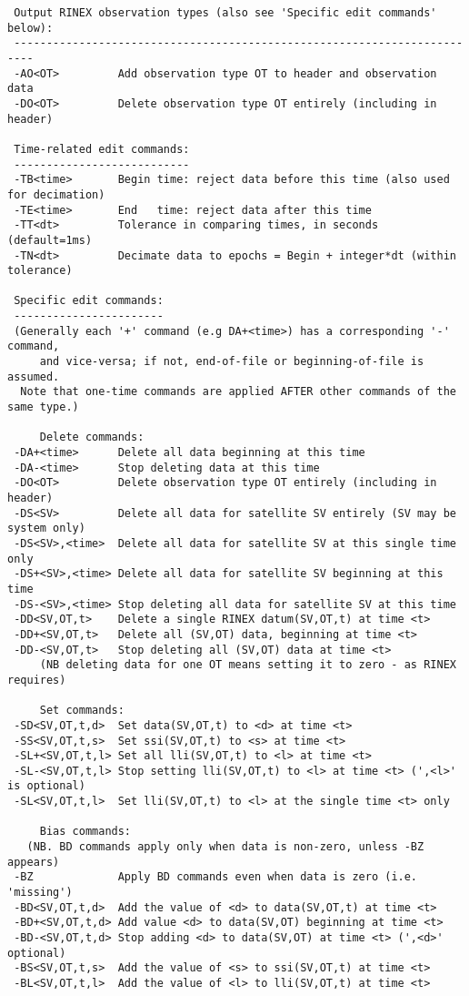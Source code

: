 \begin{\outputsize}
\begin{verbatim}
 Output RINEX observation types (also see 'Specific edit commands' below):
 -------------------------------------------------------------------------
 -AO<OT>         Add observation type OT to header and observation data
 -DO<OT>         Delete observation type OT entirely (including in header)

 Time-related edit commands:
 ---------------------------
 -TB<time>       Begin time: reject data before this time (also used for decimation)
 -TE<time>       End   time: reject data after this time
 -TT<dt>         Tolerance in comparing times, in seconds (default=1ms)
 -TN<dt>         Decimate data to epochs = Begin + integer*dt (within tolerance)

 Specific edit commands:
 -----------------------
 (Generally each '+' command (e.g DA+<time>) has a corresponding '-' command,
     and vice-versa; if not, end-of-file or beginning-of-file is assumed.
  Note that one-time commands are applied AFTER other commands of the same type.)

     Delete commands:
 -DA+<time>      Delete all data beginning at this time
 -DA-<time>      Stop deleting data at this time
 -DO<OT>         Delete observation type OT entirely (including in header)
 -DS<SV>         Delete all data for satellite SV entirely (SV may be system only)
 -DS<SV>,<time>  Delete all data for satellite SV at this single time only
 -DS+<SV>,<time> Delete all data for satellite SV beginning at this time
 -DS-<SV>,<time> Stop deleting all data for satellite SV at this time
 -DD<SV,OT,t>    Delete a single RINEX datum(SV,OT,t) at time <t>
 -DD+<SV,OT,t>   Delete all (SV,OT) data, beginning at time <t>
 -DD-<SV,OT,t>   Stop deleting all (SV,OT) data at time <t>
     (NB deleting data for one OT means setting it to zero - as RINEX requires)

     Set commands:
 -SD<SV,OT,t,d>  Set data(SV,OT,t) to <d> at time <t>
 -SS<SV,OT,t,s>  Set ssi(SV,OT,t) to <s> at time <t>
 -SL+<SV,OT,t,l> Set all lli(SV,OT,t) to <l> at time <t>
 -SL-<SV,OT,t,l> Stop setting lli(SV,OT,t) to <l> at time <t> (',<l>' is optional)
 -SL<SV,OT,t,l>  Set lli(SV,OT,t) to <l> at the single time <t> only

     Bias commands:
   (NB. BD commands apply only when data is non-zero, unless -BZ appears)
 -BZ             Apply BD commands even when data is zero (i.e. 'missing')
 -BD<SV,OT,t,d>  Add the value of <d> to data(SV,OT,t) at time <t>
 -BD+<SV,OT,t,d> Add value <d> to data(SV,OT) beginning at time <t>
 -BD-<SV,OT,t,d> Stop adding <d> to data(SV,OT) at time <t> (',<d>' optional)
 -BS<SV,OT,t,s>  Add the value of <s> to ssi(SV,OT,t) at time <t>
 -BL<SV,OT,t,l>  Add the value of <l> to lli(SV,OT,t) at time <t>
\end{verbatim}
\end{\outputsize}
%
